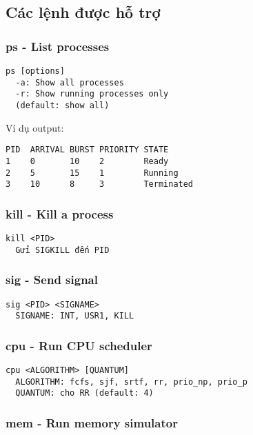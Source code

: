 \subsection{Các lệnh được hỗ trợ}

\subsubsection{ps - List processes}

\begin{lstlisting}
ps [options]
  -a: Show all processes
  -r: Show running processes only
  (default: show all)
\end{lstlisting}

Ví dụ output:
\begin{verbatim}
PID  ARRIVAL BURST PRIORITY STATE
1    0       10    2        Ready
2    5       15    1        Running
3    10      8     3        Terminated
\end{verbatim}

\subsubsection{kill - Kill a process}

\begin{lstlisting}
kill <PID>
  Gửi SIGKILL đến PID
\end{lstlisting}

\subsubsection{sig - Send signal}

\begin{lstlisting}
sig <PID> <SIGNAME>
  SIGNAME: INT, USR1, KILL
\end{lstlisting}

\subsubsection{cpu - Run CPU scheduler}

\begin{lstlisting}
cpu <ALGORITHM> [QUANTUM]
  ALGORITHM: fcfs, sjf, srtf, rr, prio_np, prio_p
  QUANTUM: cho RR (default: 4)
\end{lstlisting}

\subsubsection{mem - Run memory simulator}

